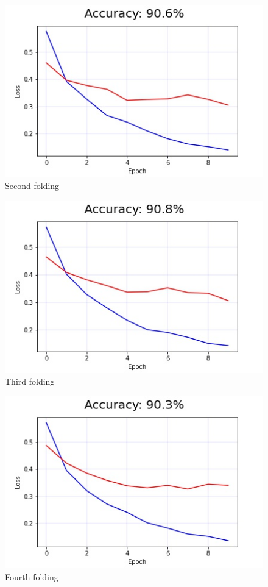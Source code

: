 \documentclass[11pt]{article}
\begin{document}
\begin{figure}[H]
    \centerline{\includegraphics[scale=.5]{image2.jpg}}
    \caption{Second folding}
    \label{fig}
\end{figure}

\begin{figure}[H]
    \centerline{\includegraphics[scale=.5]{image3.jpg}}
    \caption{Third folding}
    \label{fig}
\end{figure}

\begin{figure}[H]
    \centerline{\includegraphics[scale=.5]{image4.jpg}}
    \caption{Fourth folding}
    \label{fig}
\end{figure}
\end{document}
